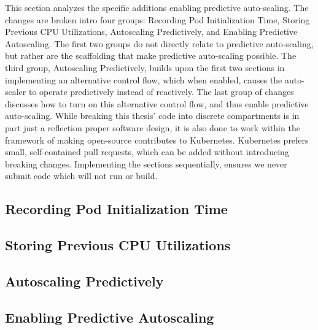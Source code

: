 This section analyzes the specific additions enabling predictive auto-scaling.
The changes are broken intro four groups: Recording Pod Initialization Time,
Storing Previous CPU Utilizations, Autoscaling Predictively, and Enabling
Predictive Autoscaling. The first two groups do not directly relate to
predictive auto-scaling, but rather are the scaffolding that make predictive
auto-scaling possible. The third group, Autoscaling Predictively, builds upon
the first two sections in implementing an alternative control flow, which when
enabled, causes the auto-scaler to operate predictively instead of reactively.
The last group of changes discusses how to turn on this alternative control
flow, and thus enable predictive auto-scaling. While breaking this thesis' code
into discrete compartments is in part just a reflection proper software design,
it is also done to work within the framework of making open-source contributes
to Kubernetes. Kubernetes prefers small, self-contained pull requests, which can
be added without introducing breaking changes. Implementing the sections sequentially, ensures
we never submit code which will not run or build.

\subsection{Recording Pod Initialization Time}



\subsection{Storing Previous CPU Utilizations}



\subsection{Autoscaling Predictively}
\label{autoscaling-predictively}



\subsection{Enabling Predictive Autoscaling}


